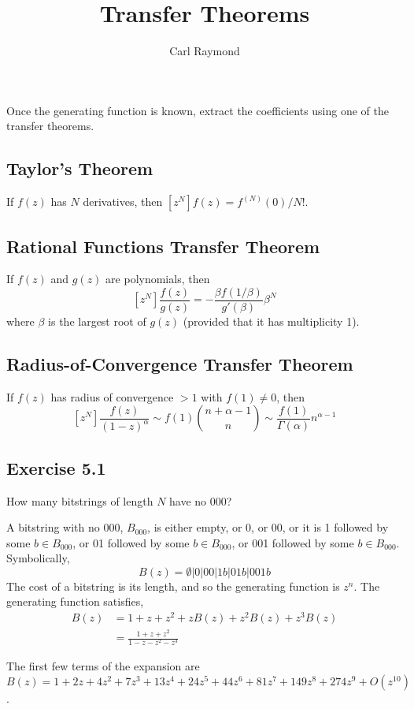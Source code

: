 \documentclass[11pt, oneside]{article}   	%
\title{Transfer Theorems}
\author{Carl Raymond}
\begin{document}
\maketitle

Once the generating function is known, extract the coefficients using one of the transfer theorems.

\subsection*{Taylor's Theorem}
If $f(z)$ has $N$ derivatives, then $[z^N]f(z) = f^{(N)}(0)/N!$.

\subsection*{Rational Functions Transfer Theorem}
If $f(z)$ and $g(z)$ are polynomials, then
\[
	[z^N]\frac{f(z)}{g(z)} = - \frac{\beta f(1/\beta)}{g'(\beta)} \beta^N
\]
where $\beta$ is the largest root of $g(z)$ (provided that it has multiplicity 1).

\subsection*{Radius-of-Convergence Transfer Theorem}
If $f(z)$ has radius of convergence $> 1$ with $f(1) \ne 0$, then
\[
	\left[ z^N \right] \frac{f(z)}{(1-z)^\alpha} \sim f(1)\binom{n+\alpha-1}{n} \sim \frac{f(1)}{\Gamma(\alpha)} n^{\alpha-1}
\]

\subsection*{Exercise 5.1}
How many bitstrings of length $N$ have no $000$?

A bitstring with no $000$, $B_{000}$, is either empty, or 0, or 00, or it is 1 followed by some $b \in B_{000}$, or 01 followed by some  $b \in B_{000}$,
or 001 followed by some $b \in B_{000}$.  Symbolically,
\[
	B(z) = \emptyset   | 0 | 00 | 1b | 01b | 001b
\]
The cost of a bitstring is its length, and so the generating function is $z^n$. The generating function satisfies,
\begin{align*}
	B(z) &= 1 + z + z^2 + zB(z) + z^2B(z) + z^3B(z) \\
		&= \frac{1+z+z^2}{1-z-z^2-z^3}
\end{align*}

The first few terms of the expansion are $B(z) = 1 + 2z + 4z^2 + 7z^3 + 13z^4 + 24z^5 + 44z^6 + 81z^7 + 149z^8 + 274z^9 + O(z^{10})$.
\end{document}
